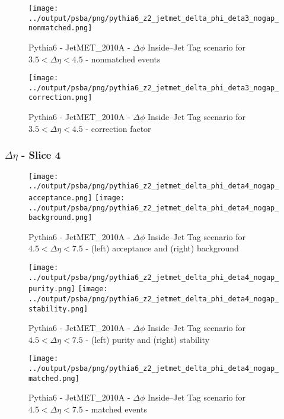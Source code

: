 \documentclass[11pt]{book}
\begin{document}
\begin{figure}[ht]
\centering
\texttt{[image: ../output/psba/png/pythia6\_z2\_jetmet\_delta\_phi\_deta3\_nogap\_nonmatched.png]}
\caption{Pythia6 - JetMET\_2010A - $\Delta\phi$ Inside--Jet Tag scenario for $3.5 < \Delta\eta < 4.5$ - nonmatched events}
\label{fig:p6_jetmet_delta_phi_deta3_nogap_nonmatched}
\end{figure}

\begin{figure}[ht]
\centering
\texttt{[image: ../output/psba/png/pythia6\_z2\_jetmet\_delta\_phi\_deta3\_nogap\_correction.png]}
\caption{Pythia6 - JetMET\_2010A - $\Delta\phi$ Inside--Jet Tag scenario for $3.5 < \Delta\eta < 4.5$ - correction factor}
\label{fig:p6_jetmet_delta_phi_deta3_nogap_correction}
\end{figure}


\clearpage
\subsubsection{$\Delta\eta$ - Slice 4}
\begin{figure}[ht]
\centering
\texttt{[image: ../output/psba/png/pythia6\_z2\_jetmet\_delta\_phi\_deta4\_nogap\_acceptance.png]}
\texttt{[image: ../output/psba/png/pythia6\_z2\_jetmet\_delta\_phi\_deta4\_nogap\_background.png]}
\caption{Pythia6 - JetMET\_2010A - $\Delta\phi$ Inside--Jet Tag scenario for $4.5 < \Delta\eta < 7.5$ - (left) acceptance and (right) background}
\label{fig:p6_jetmet_delta_phi_deta4_nogap_ab}
\end{figure}

\begin{figure}[ht]
\centering
\texttt{[image: ../output/psba/png/pythia6\_z2\_jetmet\_delta\_phi\_deta4\_nogap\_purity.png]}
\texttt{[image: ../output/psba/png/pythia6\_z2\_jetmet\_delta\_phi\_deta4\_nogap\_stability.png]}
\caption{Pythia6 - JetMET\_2010A - $\Delta\phi$ Inside--Jet Tag scenario for $4.5 < \Delta\eta < 7.5$ - (left) purity and (right) stability}
\label{fig:p6_jetmet_delta_phi_deta4_nogap_ps}
\end{figure}

\begin{figure}[ht]
\centering
\texttt{[image: ../output/psba/png/pythia6\_z2\_jetmet\_delta\_phi\_deta4\_nogap\_matched.png]}
\caption{Pythia6 - JetMET\_2010A - $\Delta\phi$ Inside--Jet Tag scenario for $4.5 < \Delta\eta < 7.5$ - matched events}
\label{fig:p6_jetmet_delta_phi_deta4_nogap_matched}
\end{figure}
\end{document}
